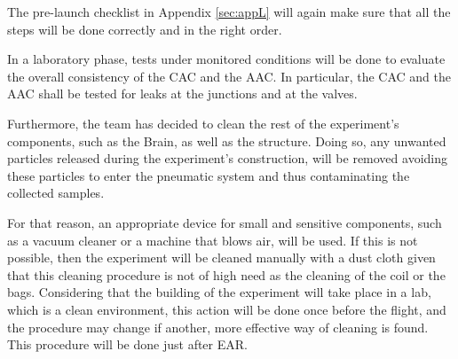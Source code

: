 
The pre-launch checklist in Appendix \ref{sec:appL} will again make sure that all the steps will be done correctly and in the right order. 

In a laboratory phase, tests under monitored conditions will be done to evaluate the overall consistency of the CAC and the AAC. In particular, the CAC and the AAC shall be tested for leaks at the junctions and at the valves. 

Furthermore, the team has decided to clean the rest of the experiment's components, such as the Brain, as well as the structure. Doing so, any unwanted particles released during the experiment's construction, will be removed avoiding these particles to enter the pneumatic system and thus contaminating the collected samples. 

For that reason, an appropriate device for small and sensitive components, such as a vacuum cleaner or a machine that blows air, will be used. If this is not possible, then the experiment will be cleaned manually with a dust cloth given that this cleaning procedure is not of high need as the cleaning of the coil or the bags. Considering that the building of the experiment will take place in a lab, which is a clean environment, this action will be done once before the flight, and the procedure may change if another, more effective way of cleaning is found. This procedure will be done just after EAR.
